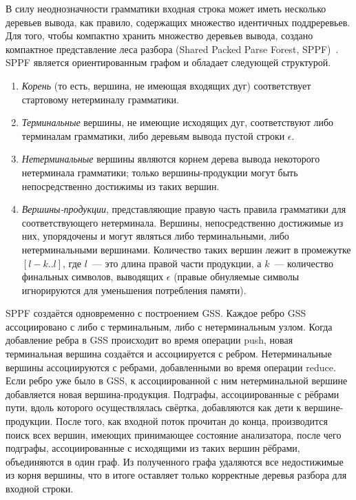 В силу неоднозначности грамматики входная строка может иметь несколько деревьев вывода, как правило, содержащих множество идентичных поддреревьев. Для того, чтобы компактно хранить множество деревьев вывода, создано компактное представление леса разбора (Shared Packed Parse Forest, SPPF)~\cite{SPPF}. SPPF является ориентированным графом и обладает следующей структурой.
\begin{enumerate}
  \item \emph{Корень} (то есть, вершина, не имеющая входящих дуг) соответствует стартовому нетерминалу грамматики.
  \item \emph{Терминальные} вершины, не имеющие исходящих дуг, соответствуют либо терминалам грамматики, либо деревьям вывода пустой строки $\epsilon$.
  \item \emph{Нетерминальные} вершины являются корнем дерева вывода некоторого нетерминала грамматики; только вершины-продукции могут быть непосредственно достижимы из таких вершин.
  \item \emph{Вершины-продукции}, представляющие правую часть правила грамматики для соответствующего нетерминала. Вершины, непосредственно достижимые из них, упорядочены и могут являться либо терминальными, либо нетерминальными вершинами. Количество таких вершин лежит в промежутке $[l-k..l]$, где $l$~--- это длина правой части продукции, а $k$~--- количество финальных символов, выводящих $\epsilon$ (правые обнуляемые символы игнорируются для уменьшения потребления памяти).
\end{enumerate}

SPPF создаётся одновременно с построением GSS. Каждое ребро GSS ассоциировано с либо с терминальным, либо с нетерминальным узлом. Когда добавление ребра в GSS происходит во время операции push, новая терминальная вершина создаётся и ассоциируется с ребром. Нетерминальные вершины ассоциируются с ребрами, добавленными во время операции reduce. Если ребро уже было в GSS, к ассоциированной с ним нетерминальной вершине добавляется новая вершина-продукция. Подграфы, ассоциированные с рёбрами пути, вдоль которого осуществлялась свёртка, добавляются как дети к вершине-продукции. После того, как входной поток прочитан до конца, производится поиск всех вершин, имеющих принимающее состояние анализатора, после чего подграфы, ассоциированные с исходящими из таких вершин рёбрами, объединяются в один граф. Из полученного графа удаляются все недостижимые из корня вершины, что в итоге оставляет только корректные деревья разбора для входной строки. 


